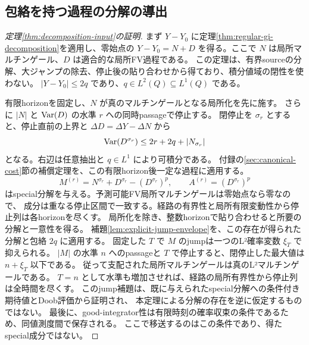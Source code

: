 \subsection{包絡を持つ過程の分解の導出}
\label{sec:interface-decomposition}
\begin{proof}[定理\ref{thm:decomposition-input}の証明]
まず $Y-Y_0$ に定理\ref{thm:regular-gi-decomposition}を適用し、零始点の
$Y-Y_0=N+D$ を得る。ここで $N$ は局所マルチンゲール、$D$ は適合的な局所FV過程である。
この定理は、有界sourceの分解、大ジャンプの除去、停止後の貼り合わせから得ており、積分値域の閉性を使わない。
$|Y-Y_0|\leq2q$ であり、$q\in L^2(Q)\subseteq L^1(Q)$ である。

有限horizonを固定し、$N$ が真のマルチンゲールとなる局所化を先に施す。
さらに $|N|$ と $\operatorname{Var}(D)$ の水準 $r$ への同時passageで停止する。
閉停止を $\sigma_r$ とすると、停止直前の上界と
$\Delta D=\Delta Y-\Delta N$ から
\[
 \operatorname{Var}(D^{\sigma_r})\leq2r+2q+|N_{\sigma_r}|
\]
となる。右辺は任意抽出と $q\in L^1$ により可積分である。
付録の\ref{sec:canonical-cost}節の補償定理を、この有限horizon後一定な過程に適用する。
\[
 M^{(r)}=N^{\sigma_r}+D^{\sigma_r}-(D^{\sigma_r})^p,
 \qquad A^{(r)}=(D^{\sigma_r})^p
\]
はspecial分解を与える。予測可能FV局所マルチンゲールは零始点なら零なので、
成分は重なる停止区間で一致する。経路の有界性と局所有限変動性から停止列は各horizonを尽くす。
局所化を除き、整数horizonで貼り合わせると所要の分解と一意性を得る。
補題\ref{lem:explicit-jump-envelope}を、この存在が得られた分解と包絡 $2q$ に適用する。
固定した $T$ で $M$ のjumpは一つのL²確率変数 $\xi_T$ で抑えられる。
$|M|$ の水準 $n$ へのpassageと $T$ で停止すると、閉停止した最大値は $n+\xi_T$ 以下である。
従って支配された局所マルチンゲールは真のL²マルチンゲールである。
$T=n$ として水準も増加させれば、経路の局所有界性から停止列は全時間を尽くす。
このjump補題は、既に与えられたspecial分解への条件付き期待値とDoob評価から証明され、
本定理による分解の存在を逆に仮定するものではない。
最後に、good-integrator性は有限時刻の確率収束の条件であるため、同値測度間で保存される。
ここで移送するのはこの条件であり、得たspecial成分ではない。
\end{proof}
